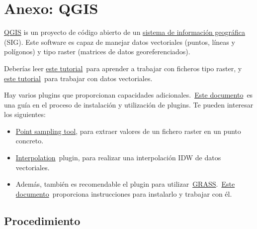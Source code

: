 \documentclass[11pt]{article}
\begin{document}
\section{Anexo: QGIS}
\label{sec:qgis}

\href{https://qgis.org/es/site/}{QGIS} is un proyecto de código
abierto de un
\href{https://es.wikipedia.org/wiki/Sistema\_de\_informaci\%C3\%B3n\_geogr\%C3\%A1fica}{sistema
  de información geográfica} (SIG). Este software es capaz de manejar
datos vectoriales (puntos, líneas y polígonos) y tipo raster (matrices
de datos georeferenciados).

Deberías leer
\href{https://docs.qgis.org/3.22/es/docs/user\_manual/working\_with\_raster/index.html}{este
  tutorial} para aprender a trabajar con ficheros tipo raster, y
\href{http://docs.qgis.org/3.22/es/docs/user\_manual/working\_with\_vector/index.html}{este
  tutorial} para trabajar con datos vectoriales.

Hay varios plugins que proporcionan capacidades
adicionales. \href{https://docs.qgis.org/3.22/es/docs/training\_manual/qgis\_plugins/fetching\_plugins.html}{Este
  documento} es una guía en el proceso de instalación y utilización de
plugins. Te pueden interesar los siguientes:

\begin{itemize}
\item \href{https://plugins.qgis.org/plugins/pointsamplingtool/}{Point
    sampling tool}, para extraer valores de un fichero raster en un
  punto concreto.
\item
  \href{https://docs.qgis.org/3.22/es/docs/user\_manual/plugins/plugins\_interpolation.html}{Interpolation} plugin,
  para realizar una interpolación IDW de datos vectoriales.
\item Además, también es recomendable el plugin para
  utilizar \href{https://grass.osgeo.org/}{GRASS}. \href{http://docs.qgis.org/3.22/es/docs/user\_manual/grass\_integration/grass\_integration.html}{Este
    documento} proporciona instrucciones para instalarlo y trabajar
  con él.
\end{itemize}

\subsection*{Procedimiento}
\label{sec:orge72c353}
\end{document}
